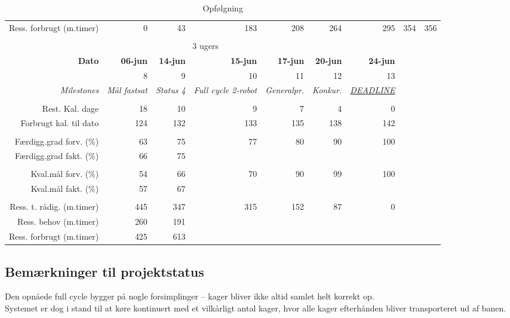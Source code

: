 \begin{sidewaystable}[!htbp]
\begin{footnotesize}
\begin{tabular}{r|rrrrrrrr}
    Ress. forbrugt (m.timer) & 0     & 43    & 183   & 208   & 264   & 295   & 354   & 356 \\%
%
%
\\
 & \multicolumn{4}{c}{3 ugers} \\ \hline
    \textbf{Dato} & \textbf{06-jun} & \textbf{14-jun} & \textbf{15-jun} & \textbf{17-jun} & \textbf{20-jun} & \textbf{24-jun} \\
 &       8     & 9     & 10    & 11  & 12 & 13\\
    \textit{Milestones} & \multicolumn{1}{c}{\textit{Mål fastsat}} & \multicolumn{1}{c}{\textit{Status 4}} & \multicolumn{1}{c}{\textit{Full cycle 2-robot}} & \multicolumn{1}{c}{\textit{Generalpr.}} & \multicolumn{1}{c}{\textit{Konkur.}} & \multicolumn{1}{c}{\textit{\underline{DEADLINE}}} \\
 & & & & & \\
    Rest. Kal. dage & 18 & 10 & 9   & 7     & 4     & 0 \\
    Forbrugt kal. til dato & 124 & 132 & 133   & 135   & 138   & 142 \\
 &       &       &     &  & & \\
    Færdigg.grad forv. (\%) & 63 & 75 & 77    & 80    & 90   & 100 \\
    Færdigg.grad fakt. (\%) & 66 & 75 &  &      &       & \\
 &       &       &       & & \\
    Kval.mål forv. (\%) & 54    & 66 & 70  & 90    & 99  & 100 \\
    Kval.mål fakt. (\%) & 57    & 67 &    &       &     & \\
 &       &       &     &  &  & \\
    Ress. t. rådig. (m.timer) & 445  & 347 & 315   & 152   & 87    & 0 \\
    Ress. behov (m.timer) & 260 & 191 & &       &       & \\
    Ress. forbrugt (m.timer) & 425 & 613 &  &       &       &
    \end{tabular}%
\end{footnotesize}
\caption{Opfølgning}\label{tab:opfolgning}
\end{sidewaystable}

\subsection{Bemærkninger til projektstatus}
Den opnåede full cycle bygger på nogle forsimplinger -- kager bliver ikke altid samlet helt korrekt op.\\
Systemet er dog i stand til at køre kontinuert med et vilkårligt antal kager, hvor alle kager efterhånden bliver transporteret ud af banen.